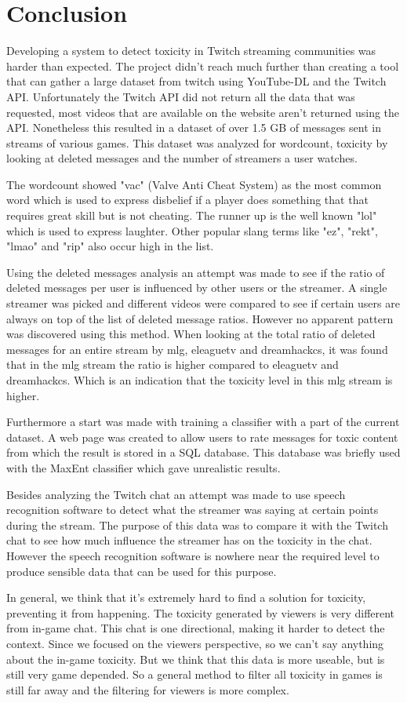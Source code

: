 \documentclass[final]{report}
\begin{document}
\chapter{Conclusion}
\label{ch:conclusion}

Developing a system to detect toxicity in Twitch streaming communities was harder than expected. The project didn't reach much further than creating a tool that can gather a large dataset from twitch using YouTube-DL and the Twitch API. Unfortunately the Twitch API did not return all the data that was requested, most videos that are available on the website aren't returned using the API. Nonetheless this resulted in a dataset of over 1.5 GB of messages sent in streams of various games. This dataset was analyzed for wordcount, toxicity by looking at deleted messages and the number of streamers a user watches.

The wordcount showed "vac" (Valve Anti Cheat System) as the most common word which is used to express disbelief if a player does something that that requires great skill but is not cheating. The runner up is the well known "lol" which is used to express laughter. Other popular slang terms like "ez", "rekt", "lmao" and "rip" also occur high in the list.

Using the deleted messages analysis an attempt was made to see if the ratio of deleted messages per user is influenced by other users or the streamer. A single streamer was picked and different videos were compared to see if certain users are always on top of the list of deleted message ratios. However no apparent pattern was discovered using this method. When looking at the total ratio of deleted messages for an entire stream by mlg, eleaguetv and dreamhackcs, it was found that in the mlg stream the ratio is higher compared to eleaguetv and dreamhackcs. Which is an indication that the toxicity level in this mlg stream is higher.

Furthermore a start was made with training a classifier with a part of the current dataset. A web page was created to allow users to rate messages for toxic content from which the result is stored in a SQL database. This database was briefly used with the MaxEnt classifier which gave unrealistic results.

Besides analyzing the Twitch chat an attempt was made to use speech recognition software to detect what the streamer was saying at certain points during the stream. The purpose of this data was to compare it with the Twitch chat to see how much influence the streamer has on the toxicity in the chat. However the speech recognition software is nowhere near the required level to produce sensible data that can be used for this purpose. 

In general, we think that it's extremely hard to find a solution for toxicity, preventing it from happening. The toxicity generated by viewers is very different from in-game chat. This chat is one directional, making it harder to detect the context. Since we focused on the viewers perspective, so we can't say anything about the in-game toxicity. But we think that this data is more useable, but is still very game depended. So a general method to filter all toxicity in games is still far away and the filtering for viewers is more complex.
\end{document}
